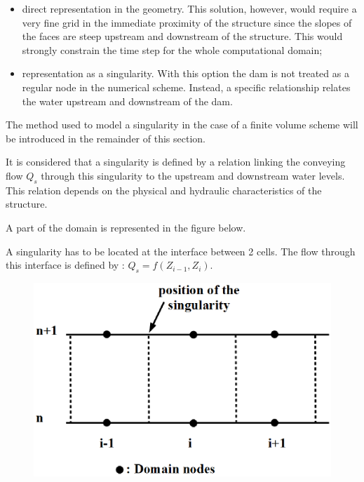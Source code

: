 \begin{itemize}
 \item direct representation in the geometry. This solution, however, would require a very fine grid in the immediate proximity of the structure since the slopes of the faces are steep upstream and downstream of the structure. This would strongly constrain the time step for the whole computational domain;
 \item representation as a singularity. With this option the dam is not treated as a regular node in the numerical scheme. Instead, a specific relationship relates the water upstream and downstream of the dam.
\end{itemize}

\vspace{0.5cm}

The method used to model a singularity in the case of a finite volume scheme will be introduced in the remainder of this section.

\vspace{0.5cm}

It is considered that a singularity is defined by a relation linking the conveying flow $Q_s$ through this singularity to the upstream and downstream water levels. This relation depends on the physical and hydraulic characteristics of the structure.

\vspace{0.5cm}

A part of the domain is represented in the figure below.

\vspace{0.5cm}

A singularity has to be located at the interface between 2 cells. The flow through this interface is defined by : $Q_s = f(Z_{i-1},Z_i)$.

\begin{figure}[h]
    \begin{center}
     \includegraphics[scale=0.8]{Figures/posSing.eps}
    \end{center}
\end{figure}


